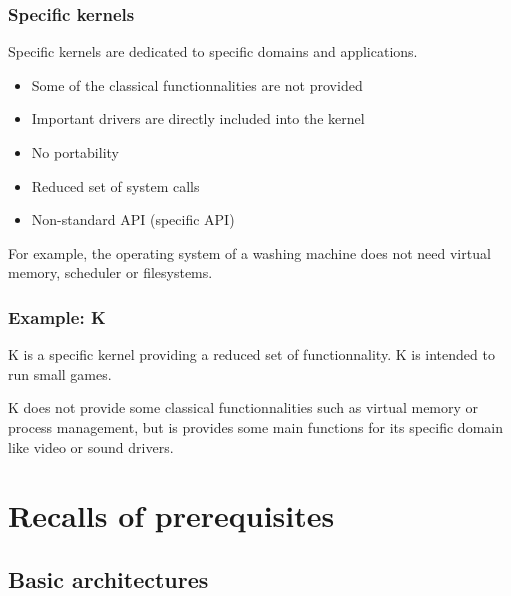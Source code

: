 \begin{frame}
  \frametitle{Specific kernels}

  Specific kernels are dedicated to specific domains and applications.

  \begin{itemize}
  \item
    Some of the classical functionnalities are not provided
  \item
    Important drivers are directly included into the kernel
  \item
    No portability
  \item
    Reduced set of system calls
  \item
    Non-standard API (specific API)
  \end{itemize}

  \-

  For example, the operating system of a washing machine does not need
  virtual memory, scheduler or filesystems.

\end{frame}

%
%

\begin{frame}
  \frametitle{Example: K}

  K is a specific kernel providing a reduced set of functionnality. K
  is intended to run small games.

  \begin{center}
  \end{center}

  K does not provide some classical functionnalities such as virtual
  memory or process management, but is provides some main functions
  for its specific domain like video or sound drivers.

\end{frame}

%
%

\section{Recalls of prerequisites}

%
%

\subsection{Basic architectures}


